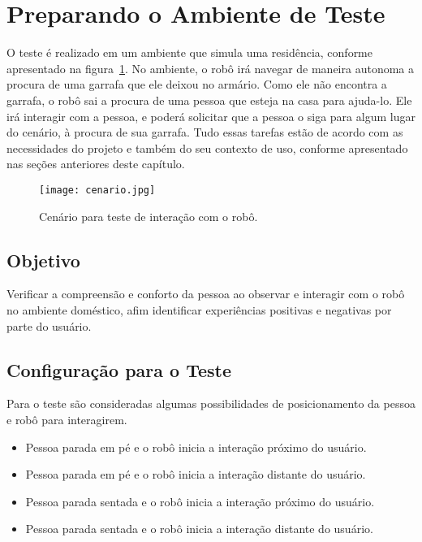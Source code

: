 \section{Preparando o Ambiente de Teste}
\label{sec:cenario}
O teste é realizado em um ambiente que simula uma residência, conforme apresentado na figura~\ref{fig:cenario}. No ambiente, o robô irá navegar de maneira autonoma a procura de uma garrafa que ele deixou no armário. Como ele não encontra a garrafa, o robô sai a procura de uma pessoa que esteja na casa para ajuda-lo. Ele irá interagir com a pessoa, e poderá solicitar que a pessoa o siga para algum lugar do cenário, à procura de sua garrafa. Tudo essas tarefas estão de acordo com as necessidades do projeto e também do seu contexto de uso, conforme apresentado nas seções anteriores deste capítulo.

\begin{figure}[ht!]
	\centering
	\begin{minipage}{\textwidth}
		\caption{Cenário para teste de interação com o robô.}
		\texttt{[image: cenario.jpg]}
		\label{fig:cenario}
	\end{minipage}
\end{figure}

\subsection{Objetivo}

Verificar a compreensão e conforto da pessoa ao observar e interagir com o robô no ambiente doméstico, afim identificar experiências positivas e negativas por parte do usuário.

\subsection{Configuração para o Teste}

Para o teste são consideradas algumas possibilidades de posicionamento da pessoa e robô para interagirem.

\begin{itemize}
	\item Pessoa parada em pé e o robô inicia a interação próximo do usuário.
	\item Pessoa parada em pé e o robô inicia a interação distante do usuário.
	\item Pessoa parada sentada e o robô inicia a interação próximo do usuário.
	\item Pessoa parada sentada e o robô inicia a interação distante do usuário.
\end{itemize}

